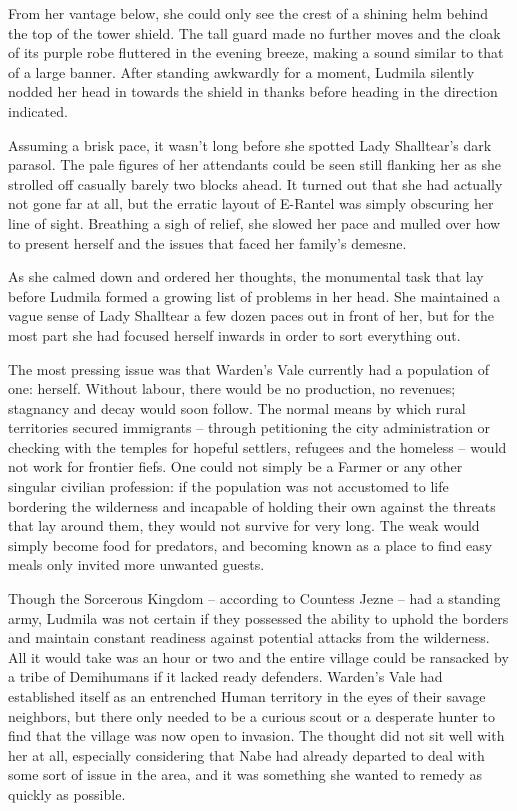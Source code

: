  

From her vantage below, she could only see the crest of a shining helm behind the top of the tower shield. The tall guard made no further moves and the cloak of its purple robe fluttered in the evening breeze, making a sound similar to that of a large banner. After standing awkwardly for a moment, Ludmila silently nodded her head in towards the shield in thanks before heading in the direction indicated.

 

Assuming a brisk pace, it wasn’t long before she spotted Lady Shalltear’s dark parasol. The pale figures of her attendants could be seen still flanking her as she strolled off casually barely two blocks ahead. It turned out that she had actually not gone far at all, but the erratic layout of E-Rantel was simply obscuring her line of sight. Breathing a sigh of relief, she slowed her pace and mulled over how to present herself and the issues that faced her family’s demesne.

 

As she calmed down and ordered her thoughts, the monumental task that lay before Ludmila formed a growing list of problems in her head. She maintained a vague sense of Lady Shalltear a few dozen paces out in front of her, but for the most part she had focused herself inwards in order to sort everything out.

 

The most pressing issue was that Warden’s Vale currently had a population of one: herself. Without labour, there would be no production, no revenues; stagnancy and decay would soon follow. The normal means by which rural territories secured immigrants – through petitioning the city administration or checking with the temples for hopeful settlers, refugees and the homeless – would not work for frontier fiefs. One could not simply be a Farmer or any other singular civilian profession: if the population was not accustomed to life bordering the wilderness and incapable of holding their own against the threats that lay around them, they would not survive for very long. The weak would simply become food for predators, and becoming known as a place to find easy meals only invited more unwanted guests.

 

Though the Sorcerous Kingdom – according to Countess Jezne – had a standing army, Ludmila was not certain if they possessed the ability to uphold the borders and maintain constant readiness against potential attacks from the wilderness. All it would take was an hour or two and the entire village could be ransacked by a tribe of Demihumans if it lacked ready defenders. Warden’s Vale had established itself as an entrenched Human territory in the eyes of their savage neighbors, but there only needed to be a curious scout or a desperate hunter to find that the village was now open to invasion. The thought did not sit well with her at all, especially considering that Nabe had already departed to deal with some sort of issue in the area, and it was something she wanted to remedy as quickly as possible.

